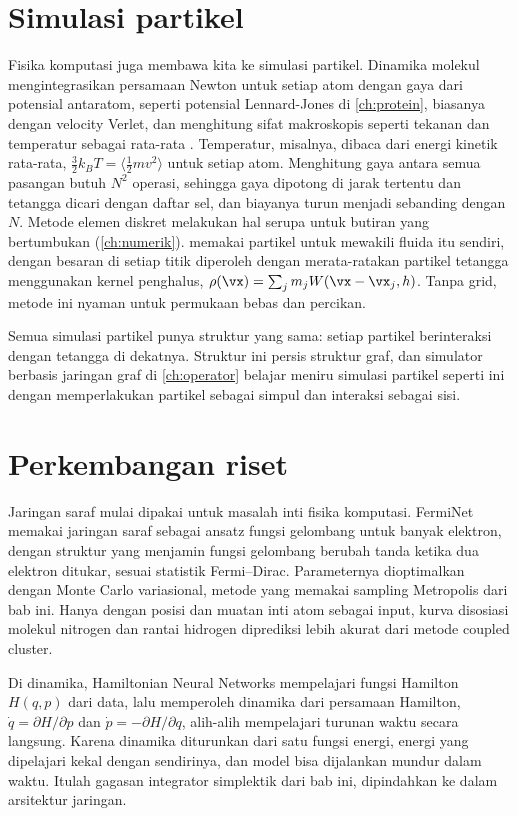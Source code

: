 \section{Simulasi partikel}

Fisika komputasi juga membawa kita ke simulasi partikel. Dinamika molekul \citep{alder1959} mengintegrasikan persamaan Newton
untuk setiap atom dengan gaya dari potensial antaratom, seperti potensial Lennard-Jones di \cref{ch:protein}, biasanya dengan
velocity Verlet, dan menghitung sifat makroskopis seperti tekanan dan temperatur sebagai rata-rata \citep{frenkel2002}.
Temperatur, misalnya, dibaca dari energi kinetik rata-rata, $\tfrac32k_BT=\langle\tfrac12mv^2\rangle$ untuk setiap atom.
Menghitung gaya antara semua pasangan butuh $N^2$ operasi, sehingga gaya dipotong di jarak tertentu dan tetangga dicari
dengan daftar sel, dan biayanya turun menjadi sebanding dengan $N$. Metode elemen diskret melakukan hal serupa untuk butiran
yang bertumbukan (\cref{ch:numerik}).  \citep{gingold1977,monaghan1992} memakai partikel
untuk mewakili fluida itu sendiri, dengan besaran di setiap titik diperoleh dengan merata-ratakan partikel tetangga
menggunakan kernel penghalus, $\rho(\vx)=\sum_jm_jW(\vx-\vx_j,h)$. Tanpa grid, metode ini nyaman untuk permukaan bebas dan
percikan.

Semua simulasi partikel punya struktur yang sama: setiap partikel berinteraksi dengan tetangga di dekatnya. Struktur ini
persis struktur graf, dan simulator berbasis jaringan graf di \cref{ch:operator} belajar meniru simulasi partikel seperti ini
dengan memperlakukan partikel sebagai simpul dan interaksi sebagai sisi.

\section{Perkembangan riset}

Jaringan saraf mulai dipakai untuk masalah inti fisika komputasi. FermiNet \citep{pfau2020} memakai jaringan saraf sebagai
ansatz fungsi gelombang untuk banyak elektron, dengan struktur yang menjamin fungsi gelombang berubah tanda ketika dua
elektron ditukar, sesuai statistik Fermi--Dirac. Parameternya dioptimalkan dengan Monte Carlo variasional, metode yang
memakai sampling Metropolis dari bab ini. Hanya dengan posisi dan muatan inti atom sebagai input, kurva disosiasi molekul
nitrogen dan rantai hidrogen diprediksi lebih akurat dari metode coupled cluster.

Di dinamika, Hamiltonian Neural Networks \citep{greydanus2019} mempelajari fungsi Hamilton $H(q,p)$ dari data, lalu
memperoleh dinamika dari persamaan Hamilton, $\dot q=\partial H/\partial p$ dan $\dot p=-\partial H/\partial q$, alih-alih
mempelajari turunan waktu secara langsung. Karena dinamika diturunkan dari satu fungsi energi, energi yang dipelajari
kekal dengan sendirinya, dan model bisa dijalankan mundur dalam waktu. Itulah gagasan integrator simplektik dari bab
ini, dipindahkan ke dalam arsitektur jaringan.

